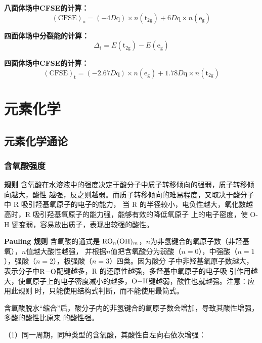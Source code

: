 \documentclass[
  10pt,
  twoside,
  openany,
  b5paper, %
  colorscheme = basic, %
  xits = false,
]{qyxf-book}
\begin{document}
\textbf{八面体场中CFSE的计算：}
	\begin{equation*}
		(\mathrm{CFSE})_\mathrm{o} = (-4D\mathrm{q}) \times n(\mathrm{t_{2g}}) + 6D\mathrm{q} \times n(\mathrm{e_{g}})
	\end{equation*}

\textbf{四面体场中分裂能的计算：}
\begin{equation*}
	\Delta_\mathrm{t} = E(\mathrm{t_{2g}}) - E(\mathrm{e_{g}})
\end{equation*}

\textbf{四面体场中CFSE的计算：}
\begin{equation*}
	(\mathrm{CFSE})_\mathrm{t} = (-2.67D\mathrm{q}) \times n(\mathrm{e_{g}}) + 1.78D\mathrm{q} \times n(\mathrm{t_{2g}})
\end{equation*}

\chapter{元素化学}

\section{元素化学通论}

\subsection{含氧酸强度}

\textbf{规则} \quad 含氧酸在水溶液中的强度决定于酸分子中质子转移倾向的强弱，质子转移倾向越大，酸性
越强，反之则越弱。而质子转移倾向的难易程度，又取决于酸分子中 R 吸引羟基氧原子的电子的能力，
当 R 的半径较小，电负性越大，氧化数越高时，R 吸引羟基氧原子的能力强，能够有效的降低氧原子
上的电子密度，使 O-H 键变弱，容易放出质子，表现出较强的酸性。

\textbf{Pauling 规则} \quad 含氧酸的通式是 $\ce{RO_n(OH)_m}$，$n$为非氢键合的氧原子数（非羟基氧），$n$值越大酸性越强，
并根据$n$值把含氧酸分为弱酸（$n=0$），中强酸（$n=1$），强酸（$n=2$），极强酸（$n=3$）四类。因为酸分
子中非羟基氧原子数越大，表示分子中$\ce{R-O}$配键越多，R 的还原性越强，多羟基中氧原子的电子吸
引作用越大，使氧原子上的电子密度减小的越多，$\ce{O-H}$键越弱，酸性也就越强。注意：应用此规则
时，只能使用结构式判断，而不能使用最简式。

含氧酸脱水“缩合”后，酸分子内的非氢键合的氧原子数会增加，导致其酸性增强，多酸的酸性比原来
的酸性强。

（1）同一周期，同种类型的含氧酸，其酸性自左向右依次增强：
\end{document}

